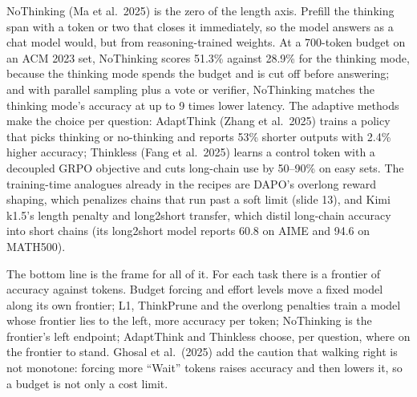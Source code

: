 \documentclass[11pt,letterpaper]{article}
\begin{document}
NoThinking (Ma et al.\ 2025) is the zero of the length axis. Prefill the thinking span with a token or two that closes it immediately, so the model answers as a chat model would, but from reasoning-trained weights. At a 700-token budget on an ACM 2023 set, NoThinking scores 51.3\% against 28.9\% for the thinking mode, because the thinking mode spends the budget and is cut off before answering; and with parallel sampling plus a vote or verifier, NoThinking matches the thinking mode's accuracy at up to 9 times lower latency. The adaptive methods make the choice per question: AdaptThink (Zhang et al.\ 2025) trains a policy that picks thinking or no-thinking and reports 53\% shorter outputs with 2.4\% higher accuracy; Thinkless (Fang et al.\ 2025) learns a control token with a decoupled GRPO objective and cuts long-chain use by 50--90\% on easy sets. The training-time analogues already in the recipes are DAPO's overlong reward shaping, which penalizes chains that run past a soft limit (slide 13), and Kimi k1.5's length penalty and long2short transfer, which distil long-chain accuracy into short chains (its long2short model reports 60.8 on AIME and 94.6 on MATH500).

The bottom line is the frame for all of it. For each task there is a frontier of accuracy against tokens. Budget forcing and effort levels move a fixed model along its own frontier; L1, ThinkPrune and the overlong penalties train a model whose frontier lies to the left, more accuracy per token; NoThinking is the frontier's left endpoint; AdaptThink and Thinkless choose, per question, where on the frontier to stand. Ghosal et al.\ (2025) add the caution that walking right is not monotone: forcing more ``Wait'' tokens raises accuracy and then lowers it, so a budget is not only a cost limit.
\end{document}
